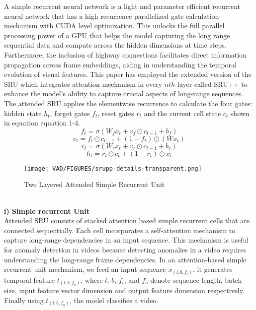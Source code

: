 \documentclass[runningheads]{llncs}
\begin{document}
A simple recurrent neural network  \cite{lei2018simple} is a light and parameter efficient recurrent neural network that has a high recurrence parallelized gate calculation mechanism with CUDA level optimization. This unlocks the full parallel processing power of a GPU that helps the model capturing the long range sequential data and compute across the hidden dimensions at time steps. Furthermore, the inclusion of highway connections facilitates direct information propagation across frame embeddings, aiding in understanding the temporal evolution of visual features. This paper has employed the extended version of the SRU which integrates attention mechanism in every $n{th}$ layer called SRU++ \cite{lei2021attention} to enhance the model's ability to capture crucial aspects of long-range sequences. \\

The attended SRU applies the elementwise recurrence to calculate the four gates: hidden state $h_t$, forget gates $f_t$, reset gates $r_t$ and the current cell state $c_t$ shown in equation equation 1-4.
\begin{equation}
f_t = \sigma(W_fx_t + v_f \odot c_{t-1} + b_f) 
\end{equation}
\begin{equation}
c_t = f_t \odot c_{t-1} + (1-f_t) \odot (Wx_t)
\end{equation}
\begin{equation}
r_t = \sigma (W_rx_t + v_r \odot c_{t-1} +b_r)
\end{equation}
\begin{equation}
h_t = r_t \odot c_t + (1 - r_t) \odot x_t 
\end{equation}
\begin{figure}
\texttt{[image: VAD/FIGURES/srupp-details-transparent.png]}
\caption{Two Layered Attended Simple Recurrent Unit} \label{fig3}
\end{figure}\\

\noindent
\textbf{i) Simple recurrent Unit}\\

Attended SRU consists of stacked attention based simple recurrent cells that are connected sequentially. Each cell incorporates a self-attention mechanism to capture long-range dependencies in an input sequence. This mechanism is useful for anomaly detection in videos because detecting anomalies in a video requires understanding the long-range frame dependencies. In an attention-based simple recurrent unit mechanism, we feed an input sequence $x_{(l, b, f_i)}$, it generates temporal feature $t_{(l,b,f_o)}$, where $l$, $b$, $f_i$, and $f_o$ denote sequence length, batch size, input feature vector dimension and output feature dimension respectively. Finally using $t_{(l,b, f_o)}$, the model classifies a video.\\
\end{document}

